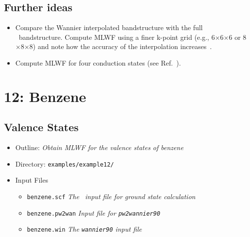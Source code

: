 \documentclass[a4paper,11pt,twoside]{article}
\begin{document}
\subsection*{Further ideas}

\begin{itemize}
\item Compare the Wannier interpolated bandstructure with the full
  \pwscf\ bandstructure. Compute MLWF using a finer
  k-point grid (e.g., 6$\times$6$\times$6 or 8$\times$8$\times$8) and
  note how the accuracy of the interpolation increases~\cite{WanInt}.
\item Compute MLWF for four conduction states (see Ref.~\cite{SMV}).
\end{itemize}


\cleardoublepage


\section*{12: Benzene}
\subsection*{Valence States}
\begin{itemize}
\item{Outline: \it{Obtain MLWF for the valence states of benzene}}
\item{Directory: {\tt examples/example12/}}
\item{Input Files}
\begin{itemize}
\item{ {\tt benzene.scf}  {\it The \pwscf\ input file for ground state
    calculation}} 
\item{ {\tt benzene.pw2wan}  {\it Input file for {\tt pw2wannier90}}}
\item{ {\tt benzene.win}  {\it The {\tt wannier90} input file}}
\end{itemize}

\end{itemize}
\end{document}
